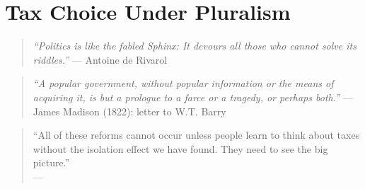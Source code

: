 
\chapter[Tax Choice Under Pluralism]{Tax Choice Under Pluralism} \label{chap:tax-under-pluralism} 



\begin{quote}
	\emph{``Politics is like the fabled Sphinx: It devours all those who cannot solve its riddles.''}
	--- Antoine de Rivarol 
\end{quote}

\begin{quote}
	\emph{``A popular government, without popular information or the means of acquiring it, is but a prologue to a farce or a tragedy, or perhaps both.''}
	--- James Madison (1822): letter to W.T. Barry
\end{quote}

\begin{quote}
	``All of these reforms cannot occur unless people learn to think about taxes without the isolation effect we have found. They need to see the big picture.''\\
	--- \cite[ 23]{McCaffery2003}
\end{quote}





